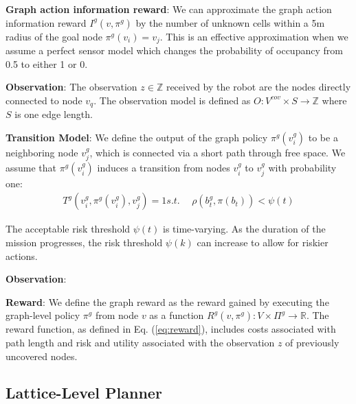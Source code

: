 \documentclass[letterpaper]{article} %
\newcommand{\ph}[1]{{\textbf{#1}:}} %
\begin{document}
\ph{Graph action information reward}
We can approximate the graph action information reward $I^g(v, \pi^g)$ by the number of unknown cells within a 5m radius of the goal node $\pi^g(v_i)=v_j$.  This is an effective approximation when we assume a perfect sensor model which changes the probability of occupancy from 0.5 to either 1 or 0.  

\ph{Observation} The observation $z \in \mathbb{Z}$ received by the robot are the nodes directly connected to node $v_q$. The observation model is defined as $O: V^{cov} \times S \rightarrow \mathbb{Z}$ where $S$ is one edge length.


\ph{Transition Model} We define the output of the graph policy $\pi^g(v_i^g)$ to be a neighboring node $v_j^g$, which is connected via a short path through free space. We assume that $\pi^{g}(v_i^g)$ induces a transition from nodes $v_i^g$ to $v_j^g$ with probability one:
\begin{align}
    T^{g} (v_i^g, \pi^g(v_i^g), v_j^g) = 1
    s.t.~&~\rho(b_t^g,\pi(b_t)) < \psi(t)
\end{align}

The acceptable risk threshold $\psi(t)$ is time-varying. As the duration of the mission progresses, the risk threshold $\psi(k)$ can increase to allow for riskier actions.

\ph{Observation}

\ph{Reward} We define the graph reward as the reward gained by executing the graph-level policy $\pi^g$ from node $v$ as a function $R^g(v, \pi^g): V \times \Pi^g \to \mathbb{R}$. The reward function, as defined in Eq. (\ref{eq:reward}), includes costs associated with path length and risk and utility associated with the observation $z$ of previously uncovered nodes. 


\subsection{Lattice-Level Planner} 
\end{document}
